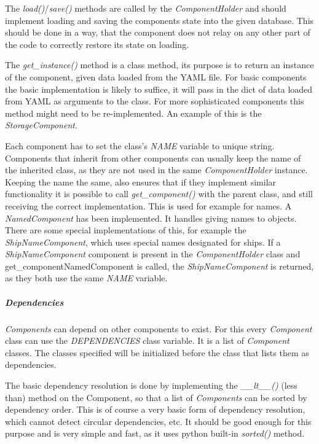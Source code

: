 The \textit{load()}/\textit{save()} methods are called by the \textit{ComponentHolder} and should
implement loading and saving the components state into the given database. This should be done in a way, that the
component does not relay on any other part of the code to correctly restore its state on loading.

The \textit{get\_instance()} method is a class method, its purpose is to return an instance of the component, given data loaded
from the YAML file. For basic components the basic implementation is likely to suffice, it will pass in the dict of data
loaded from YAML as arguments to the class. For more sophisticated components this method might need to be
re-implemented. An example of this is the \textit{StorageComponent}.

Each component has to set the class's \textit{NAME} variable to unique string. Components that inherit from other
components can usually keep the name of the inherited class, as they are not used in the same \textit{ComponentHolder}
instance. Keeping the name the same, also ensures that if they implement similar functionality it is possible to call
\textit{get\_component()} with the parent class, and still receiving the correct implementation. This is used for example
for names. A \textit{NamedComponent} has been implemented. It handles giving names to objects. There are some special
implementations of this, for example the \textit{ShipNameComponent}, which uses special names designated for ships. If a
\textit{ShipNameComponent} component is present in the \textit{ComponentHolder} class and get\_component{NamedComponent}
is called, the \textit{ShipNameComponent} is returned, as they both use the same \textit{NAME} variable.

\subparagraph{Dependencies}
\textit{Components} can depend on other components to exist. For this every \textit{Component} class can use the
\textit{DEPENDENCIES} class variable. It is a list of \textit{Component} classes. The classes specified will be
initialized before the class that lists them as dependencies. 

The basic dependency resolution is done by implementing the \textit{\_\_lt\_\_()} (less than) method on the Component,
so that a list of \textit{Components} can be sorted by dependency order. This is of course a very basic form of
dependency resolution, which cannot detect circular dependencies, etc. It should be good enough for this purpose and is very
simple and fast, as it uses python built-in \textit{sorted()} method.

